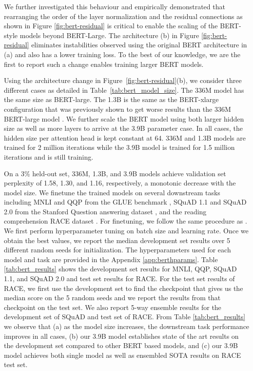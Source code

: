 We further investigated this behaviour and empirically demonstrated that rearranging the order of the layer normalization and the residual connections as shown in Figure \ref{fig:bert-residual} is critical to enable the scaling of the BERT-style models beyond BERT-Large. The architecture (b) in Figure \ref{fig:bert-residual} eliminates instabilities observed using the original BERT architecture in (a) and also has a lower training loss. To the best of our knowledge, we are the first to report such a change enables training larger BERT models. 

Using the architecture change in Figure~\ref{fig:bert-residual}(b), we consider three different cases as detailed in Table~\ref{tab:bert_model_size}. The 336M model has the same size as BERT-large. The 1.3B is the same as the BERT-xlarge configuration that was previously shown to get worse results than the 336M BERT-large model \cite{ALBERT2019}. We further scale the BERT model using both larger hidden size as well as more layers to arrive at the 3.9B parameter case. In all cases, the hidden size per attention head is kept constant at 64. 336M and 1.3B models are trained for 2 million iterations while the 3.9B model is trained for 1.5 million iterations and is still training.

On a 3\% held-out set, 336M, 1.3B, and 3.9B models achieve validation set perplexity of 1.58, 1.30, and 1.16, respectively, a monotonic decrease with the model size. We finetune the trained models on several downstream tasks including MNLI and QQP from the GLUE benchmark \cite{GLUE2019}, SQuAD 1.1 and SQuAD 2.0 from the Stanford Question answering dataset \cite{SQUAD1,SQUAD2}, and the reading comprehension RACE dataset \cite{RACE}. For finetuning, we follow the same procedure as \cite{roberta}. We first perform hyperparameter tuning on batch size and learning rate. Once we obtain the best values, we report the median development set results over 5 different random seeds for initialization. The hyperparameters used for each model and task are provided in the Appendix \ref{app:berthparams}. Table \ref{tab:bert_results} shows the development set results for MNLI, QQP, SQuAD 1.1, and SQuAD 2.0 and test set results for RACE. For the test set results of RACE, we first use the development set to find the checkpoint that gives us the median score on the 5 random seeds and we report the results from that checkpoint on the test set. We also report 5-way ensemble results for the development set of SQuAD and test set of RACE. From Table \ref{tab:bert_results} we observe that (a) as the model size increases, the downstream task performance improves in all cases, (b) our 3.9B model establishes state of the art results on the development set compared to other BERT based models, and (c) our 3.9B model achieves both single model as well as ensembled  SOTA results on RACE test set. 

